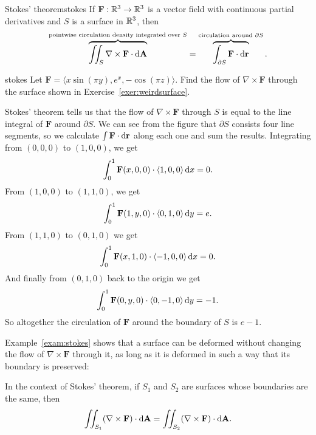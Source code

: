 \documentclass{watsonbook}
\begin{document}
\begin{theo}{Stokes' theorem}{stokes}
  If $\mathbf{F} : \mathbb{R}^3 \to \mathbb{R}^3$ is a vector field with continuous
  partial derivatives and $S$ is a surface in $\mathbb{R}^3$, then
  \[
    \overbrace{\iint_S \nabla \times \mathbf{F} \cdot
      \mathrm{d}\mathbf{A}}^{\text{pointwise circulation density integrated
        over $S$}} =
    \overbrace{\int_{\partial S} \mathbf{F} \cdot
      \mathrm{d}\mathbf{r}}^{\text{circulation around $\partial S$}}. 
  \]
\end{theo}

\begin{example}{}{stokes}
  Let $\mathbf{F} = \langle x \sin (\pi y), e^x, -\cos(\pi z)
  \rangle$. Find the flow of $\nabla \times \mathbf{F}$ through the
  surface shown in Exercise~\ref{exer:weirdsurface}.
\end{example}

\begin{solution} 
  Stokes' theorem tells us that the flow of $\nabla \times \mathbf{F}$
  through $S$ is equal to the line integral of $\mathbf{F}$ around
  $\partial S$. We can see from the figure that $\partial S$ consists
  four line segments, so we calculate $\int \mathbf{F} \cdot {\mathrm{d}}\mathbf{r}$
  along each one and sum the results. Integrating from $(0,0,0)$ to
  $(1,0,0)$, we get
  \[
    \int_0^1\mathbf{F}(x,0,0) \cdot \langle 1, 0, 0 \rangle  \, \mathrm{d} x =
    0. 
  \]
  From $(1,0,0)$ to $(1,1,0)$, we get
  \[
    \int_0^1\mathbf{F}(1,y,0) \cdot \langle 0, 1, 0 \rangle  \, \mathrm{d} y =
    e. 
  \]
  From $(1,1,0)$ to $(0,1,0)$ we get
  \[
    \int_0^1\mathbf{F}(x,1,0) \cdot \langle -1, 0, 0 \rangle  \, \mathrm{d} x = 0. 
  \]
  And finally from $(0,1,0)$ back to the origin we get
  \[
    \int_0^1\mathbf{F}(0,y,0) \cdot \langle 0, -1, 0 \rangle  \, \mathrm{d} y = -1. 
  \]
  So altogether the circulation of $\mathbf{F}$ around the boundary of
  $S$ is $\boxed{e-1}$. 
\end{solution}

Example~\ref{exam:stokes} shows that a surface can be deformed without
changing the  flow of $\nabla \times \mathbf{F}$ through it, as
long as it is deformed in such a way that its boundary is preserved: 

\begin{obs}{}{}
  In the context of Stokes' theorem, if $S_1$ and $S_2$ are surfaces
  whose boundaries are the same, then
  \[
    \iint_{S_1} (\nabla \times \mathbf{F}) \cdot \mathrm{d}\mathbf{A} =
  \iint_{S_2}
  (\nabla \times \mathbf{F})
  \cdot \mathrm{d}\mathbf{A}. 
\]
\end{obs}
\end{document}
